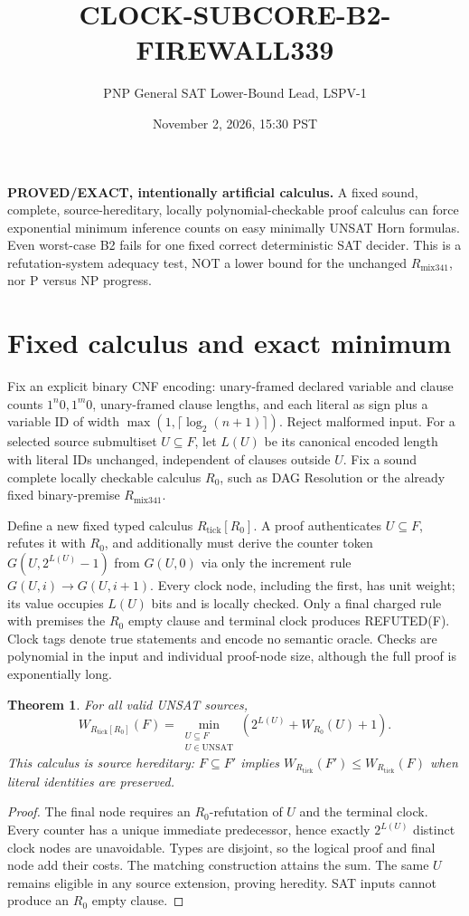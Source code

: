 \documentclass[11pt]{article}
\title{CLOCK-SUBCORE-B2-FIREWALL339}
\author{PNP General SAT Lower-Bound Lead, LSPV-1}
\date{November 2, 2026, 15:30 PST}
\newtheorem{theorem}{Theorem}
\begin{document}
\maketitle
\noindent\textbf{PROVED/EXACT, intentionally artificial calculus.} A fixed sound, complete, source-hereditary, locally polynomial-checkable proof calculus can force exponential minimum inference counts on easy minimally UNSAT Horn formulas. Even worst-case B2 fails for one fixed correct deterministic SAT decider. This is a refutation-system adequacy test, NOT a lower bound for the unchanged $R_{\mathrm{mix341}}$, nor P versus NP progress.

\section{Fixed calculus and exact minimum}
Fix an explicit binary CNF encoding: unary-framed declared variable and clause counts $1^n0,1^m0$, unary-framed clause lengths, and each literal as sign plus a variable ID of width $\max(1,\lceil\log_2(n+1)\rceil)$. Reject malformed input. For a selected source submultiset $U\subseteq F$, let $L(U)$ be its canonical encoded length with literal IDs unchanged, independent of clauses outside $U$. Fix a sound complete locally checkable calculus $R_0$, such as DAG Resolution or the already fixed binary-premise $R_{\mathrm{mix341}}$.

Define a new fixed typed calculus $R_{\mathrm{tick}}[R_0]$. A proof authenticates $U\subseteq F$, refutes it with $R_0$, and additionally must derive the counter token $G(U,2^{L(U)}-1)$ from $G(U,0)$ via only the increment rule $G(U,i)\to G(U,i+1)$. Every clock node, including the first, has unit weight; its value occupies $L(U)$ bits and is locally checked. Only a final charged rule with premises the $R_0$ empty clause and terminal clock produces REFUTED(F). Clock tags denote true statements and encode no semantic oracle. Checks are polynomial in the input and individual proof-node size, although the full proof is exponentially long.

\begin{theorem}
For all valid UNSAT sources,
\[
\boxed{W_{R_{\mathrm{tick}}[R_0]}(F)=
\min_{\substack{U\subseteq F\\U\in\mathrm{UNSAT}}}
(2^{L(U)}+W_{R_0}(U)+1).}
\]
This calculus is source hereditary: $F\subseteq F'$ implies $W_{R_{\mathrm{tick}}}(F')\le W_{R_{\mathrm{tick}}}(F)$ when literal identities are preserved.
\end{theorem}
\begin{proof}
The final node requires an $R_0$-refutation of $U$ and the terminal clock. Every counter has a unique immediate predecessor, hence exactly $2^{L(U)}$ distinct clock nodes are unavoidable. Types are disjoint, so the logical proof and final node add their costs. The matching construction attains the sum. The same $U$ remains eligible in any source extension, proving heredity. SAT inputs cannot produce an $R_0$ empty clause.
\end{proof}
\end{document}
